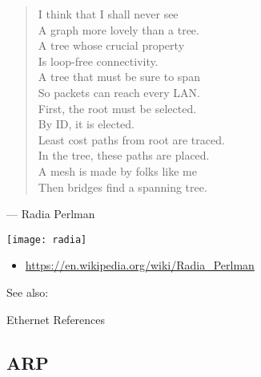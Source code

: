 \begin{minipage}{.5\linewidth}
  \begin{verse}
    I think that I shall never see\\
    A graph more lovely than a tree.\\[1ex]
    A tree whose crucial property\\
    Is loop-free connectivity.\\[1ex]
    A tree that must be sure to span\\
    So packets can reach every LAN.\\[1ex]
    First, the root must be selected.\\
    By ID, it is elected.\\[1ex]
    Least cost paths from root are traced.\\
    In the tree, these paths are placed.\\[1ex]
    A mesh is made by folks like me\\
    Then bridges find a spanning tree.\\[1ex]
  \end{verse}
  \begin{flushright}{\footnotesize --- Radia Perlman\hspace{3em}}\end{flushright}
\end{minipage}
\begin{minipage}{.2\linewidth}
  \texttt{[image: radia]}
\end{minipage}

\begin{itemize}
\item \url{https://en.wikipedia.org/wiki/Radia_Perlman}
\end{itemize}

See also: 

\begin{frame}{Ethernet References}
  \begin{refsection}
    \nocite{wiki:ethernet,wiki:ethframe,wiki:csmacd,rfc1042,wiki:switch,
      wiki:lanswitching} \printbibliography[heading=none]
  \end{refsection}
\end{frame}

\subsection{ARP}

